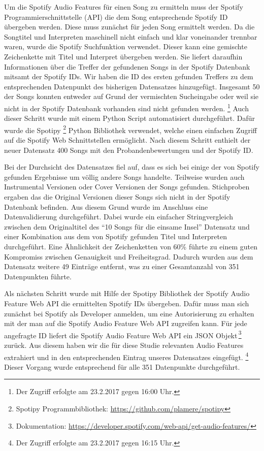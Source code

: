 Um die Spotify Audio Features für einen Song zu ermitteln muss der Spotify Programmierschnittstelle (API) die dem Song entsprechende Spotify ID übergeben werden.
Diese muss zunächst für jeden Song ermittelt werden.
Da die Songtitel und Interpreten maschinell nicht einfach und klar voneinander trennbar waren, wurde die Spotify Suchfunktion verwendet.
Dieser kann eine gemischte Zeichenkette mit Titel und Interpret übergeben werden.
Sie liefert daraufhin Informationen über die Treffer der gefundenen Songs in der Spotify Datenbank mitsamt der Spotify IDs.
Wir haben die ID des ersten gefunden Treffers zu dem entsprechenden Datenpunkt des bisherigen Datensatzes hinzugefügt.
Insgesamt 50 der Songs konnten entweder auf Grund der vermischten Sucheingabe oder weil sie nicht in der Spotify Datenbank vorhanden sind nicht gefunden werden.
\footnote{Der Zugriff erfolgte am 23.2.2017 gegen 16:00 Uhr.}
Auch dieser Schritt wurde mit einem Python Script automatisiert durchgeführt.
Dafür wurde die Spotipy \footnote{Spotipy Programmbibliothek: \url{https://github.com/plamere/spotipy}} Python Bibliothek verwendet, welche einen einfachen Zugriff auf die Spotify Web Schnittstellen ermöglicht.
Nach diesem Schritt enthielt der neuer Datensatz 400 Songs mit den Probandenbewertungen und der Spotify ID.

Bei der Durchsicht des Datensatzes fiel auf, dass es sich bei einige der von Spotify gefunden Ergebnisse um völlig andere Songs handelte.
Teilweise wurden auch Instrumental Versionen oder Cover Versionen der Songs gefunden.
Stichproben ergaben das die Original Versionen dieser Songs sich nicht in der Spotify Datenbank befinden.
Aus diesem Grund wurde im Anschluss eine Datenvalidierung durchgeführt.
Dabei wurde ein einfacher Stringvergleich zwischen dem Originaltitel des "`10 Songs für die einsame Insel"' Datensatz und einer Kombination aus dem von Spotify gefunden Titel und Interpreten durchgeführt.
Eine Ähnlichkeit der Zeichenketten von 60\% führte zu einem guten Kompromiss zwischen Genauigkeit und Freiheitsgrad.
Dadurch wurden aus dem Datensatz weitere 49 Einträge entfernt, was zu einer Gesamtanzahl von 351 Datenpunkten führte.

Als nächsten Schritt wurde mit Hilfe der Spotipy Bibliothek der Spotify Audio Feature Web API die ermittelten Spotify IDs übergeben.
Dafür muss man sich zunächst bei Spotify als Developer anmelden, um eine Autorisierung zu erhalten mit der man auf die Spotify Audio Feature Web API zugreifen kann.
Für jede angefragte ID liefert die Spotify Audio Feature Web API ein JSON Objekt\,\footnote{Dokumentation: \url{https://developer.spotify.com/web-api/get-audio-features/}} zurück.
Aus diesem haben wir die für diese Studie relevanten Audio Features extrahiert und in den entsprechenden Eintrag unseres Datensatzes eingefügt.
\footnote{Der Zugriff erfolgte am 23.2.2017 gegen 16:15 Uhr.}
Dieser Vorgang wurde entsprechend für alle 351 Datenpunkte durchgeführt.

